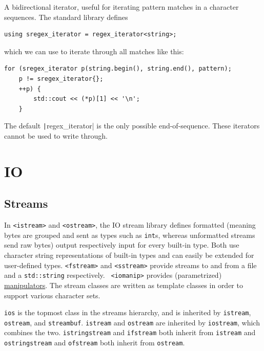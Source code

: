 \documentclass[table, xcdraw]{article}%
\begin{document}
A bidirectional iterator, useful for iterating pattern matches in a character sequences. The standard library defines

\begin{verbatim}
using sregex_iterator = regex_iterator<string>;
\end{verbatim}

which we can use to iterate through all matches like this:

\begin{verbatim}
for (sregex_iterator p(string.begin(), string.end(), pattern);
    p != sregex_iterator{};
    ++p) {
        std::cout << (*p)[1] << '\n'; 
    }
\end{verbatim}

The default \texttt|regex_iterator{}| is the only possible end-of-sequence. These iterators cannot be used to write through.

\section{IO}

\subsection{Streams}

In \texttt{<istream>} and \texttt{<ostream>}, the IO stream library defines formatted (meaning bytes are grouped and sent as types such as \texttt{int}s, whereas unformatted streams send raw bytes) output respectively input for every built-in type. Both use character string representations of built-in types and can easily be extended for user-defined types. \texttt{<fstream>} and \texttt{<sstream>} provide streams to and from a file and a \texttt{std::string} respectively. \texttt{ <iomanip>} provides (parametrized) \hyperref[manipulators]{manipulators}. The stream classes are written as template classes in order to support various character sets.

\texttt{ios} is the topmost class in the streams hierarchy, and is inherited by \texttt{istream}, \texttt{ostream}, and \texttt{streambuf}. \texttt{istream} and \texttt{ostream} are inherited by \texttt{iostream}, which combines the two. \texttt{istringstream} and \texttt{ifstream} both inherit from \texttt{istream} and \texttt{ostringstream} and \texttt{ofstream} both inherit from \texttt{ostream}.
\end{document}
